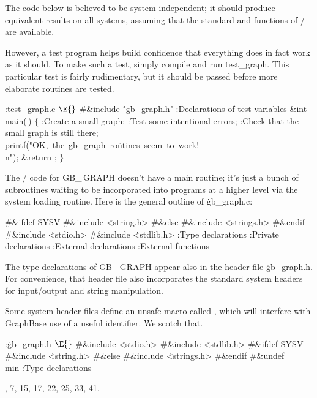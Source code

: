 \fi

The code below is believed to be system-independent; it should
produce equivalent results on all systems, assuming that the standard
 and  functions of \CEE/ are available.

However, a test program helps build confidence that everything does in fact
work as it should. To make such a test, simply compile and run \.{test\_graph}.
This particular test is fairly rudimentary, but it should be passed before
more elaborate routines are tested.

\Y\B\4:\.{test\_graph.c }\X${}\E{}$\6
\8\#\&{include} \.{"gb\_graph.h"}\6
:Declarations of test variables\X\7
\1\1\&{int} \\{main}(\,)\2\2\6
${}\{{}$\1\6
:Create a small graph\X;\6
:Test some intentional errors\X;\6
:Check that the small graph is still there\X;\6
\\{printf}(\.{"OK,\ the\ gb\_graph\ ro}\)\.{utines\ seem\ to\ work!}\)\.{%
\\n"});\6
\&{return} ;\6
\4${}\}{}$\2\par
\fi

The \CEE/ code for {\sc GB\_\,GRAPH} doesn't have a main routine;
it's just a bunch of subroutines waiting to be incorporated into
programs at a higher level via the system loading routine. Here is
the general outline of \.{gb\_graph.c}:

\Y\B\8\#\&{ifdef} \.{SYSV}\6
\8\#\&{include} \.{<string.h>}\6
\8\#\&{else}\6
\8\#\&{include} \.{<strings.h>}\6
\8\#\&{endif}\6
\8\#\&{include} \.{<stdio.h>}\6
\8\#\&{include} \.{<stdlib.h>}\6
\ATH\7
:Type declarations\X\6
:Private declarations\X\6
:External declarations\X\6
:External functions\X\par
\fi

The type declarations of {\sc GB\_\,GRAPH} appear also in the header file
\.{gb\_graph.h}. For convenience, that header file also incorporates the
standard system headers for input/output and string manipulation.

Some system header files define an unsafe macro called , which will
interfere with GraphBase use of a useful identifier. We scotch that.

\Y\B\4:\.{gb\_graph.h }\X${}\E{}$\6
\8\#\&{include} \.{<stdio.h>}\6
\8\#\&{include} \.{<stdlib.h>}\6
\8\#\&{ifdef} \.{SYSV}\6
\8\#\&{include} \.{<string.h>}\6
\8\#\&{else}\6
\8\#\&{include} \.{<strings.h>}\6
\8\#\&{endif}\6
\8\#\&{undef} \\{min}\6
:Type declarations\X\par
{}, 7, 15, 17, 22, 25, 33, 41.\fi

